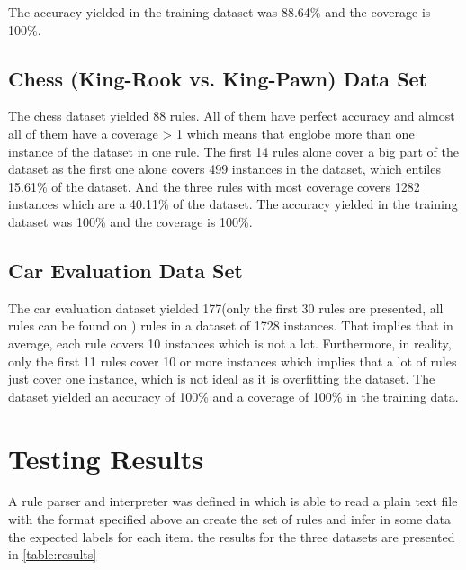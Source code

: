 The accuracy yielded in the training dataset was 88.64\% and the coverage is 100\%.



\subsection{Chess (King-Rook vs. King-Pawn) Data Set}

The chess dataset yielded 88 rules. All of them have perfect accuracy and almost all of them have a coverage > 1 which means that englobe more than one instance of the dataset in one rule. The first 14 rules alone cover a big part of the dataset as the first one alone covers 499 instances in the dataset, which entiles 15.61\% of the dataset. And the three rules with most coverage covers 1282 instances which are a 40.11\% of the dataset.
The accuracy yielded in the training dataset was 100\% and the coverage is 100\%.



\subsection{Car Evaluation Data Set}

The car evaluation dataset yielded 177(only the first 30 rules are presented, all rules can be found on ) rules in a dataset of 1728 instances. That implies that in average, each rule covers 10 instances which is not a lot. Furthermore, in reality, only the first 11 rules cover 10 or more instances which implies that a lot of rules just cover one instance, which is not ideal as it is overfitting the dataset.
The dataset yielded an accuracy of 100\% and a coverage of 100\% in the training data.


\section{Testing Results}

A rule parser and interpreter was defined in  which is able to read a plain text file with the format specified above an create the set of rules and infer in some data the expected labels for each item. the results for the three datasets are presented in \ref{table:results}

